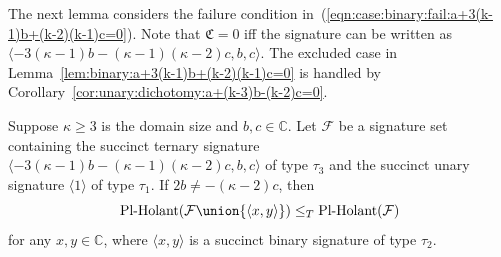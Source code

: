 \documentclass[11pt]{article}
\newcommand{\PlHolant}{\operatorname{Pl-Holant}}
\begin{document}
The next lemma considers the failure condition in~(\ref{eqn:case:binary:fail:a+3(k-1)b+(k-2)(k-1)c=0}).
Note that $\mathfrak{C} = 0$ iff the signature can be written as $\langle -3 (\kappa - 1) b - (\kappa - 1) (\kappa - 2) c, b, c \rangle$.
The excluded case in Lemma~\ref{lem:binary:a+3(k-1)b+(k-2)(k-1)c=0} is handled by Corollary~\ref{cor:unary:dichotomy:a+(k-3)b-(k-2)c=0}.

\begin{lemma} \label{lem:binary:a+3(k-1)b+(k-2)(k-1)c=0}
 Suppose $\kappa \ge 3$ is the domain size and $b, c \in \mathbb{C}$.
 Let $\mathcal{F}$ be a signature set containing the succinct ternary signature $\langle -3 (\kappa - 1) b - (\kappa - 1) (\kappa - 2) c, b, c \rangle$ of type $\tau_3$
 and the succinct unary signature $\langle 1 \rangle$ of type $\tau_1$.
 If $2 b \ne -(\kappa - 2) c$,
 then
 \[
  \PlHolant(\mathcal{F} \union \{\langle x,y \rangle\}) \le_T \PlHolant(\mathcal{F})
 \]
 for any $x,y \in \mathbb{C}$,
 where $\langle x,y \rangle$ is a succinct binary signature of type $\tau_2$.
\end{lemma}
\end{document}
